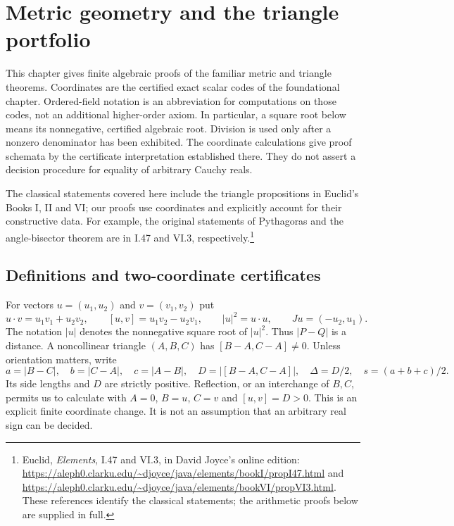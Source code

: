 \section{Metric geometry and the triangle portfolio}
\label{sec:triangles}

This chapter gives finite algebraic proofs of the familiar metric and triangle
theorems.  Coordinates are the certified exact scalar codes of the foundational
chapter.  Ordered-field notation is an abbreviation for computations on those
codes, not an additional higher-order axiom.  In particular, a square root below
means its nonnegative, certified algebraic root.  Division is used only after a
nonzero denominator has been exhibited.  The coordinate calculations give
\ipra{} proof schemata by the certificate interpretation established there.
They do not assert a decision procedure for equality of arbitrary Cauchy reals.

The classical statements covered here include the triangle propositions in
Euclid's Books I, II and VI; our proofs use coordinates and explicitly account
for their constructive data.  For example, the original statements of
Pythagoras and the angle-bisector theorem are in I.47 and VI.3,
respectively.\footnote{Euclid, \emph{Elements}, I.47 and VI.3, in David Joyce's
online edition:
\url{https://aleph0.clarku.edu/~djoyce/java/elements/bookI/propI47.html} and
\url{https://aleph0.clarku.edu/~djoyce/java/elements/bookVI/propVI3.html}.
These references identify the classical statements; the arithmetic proofs
below are supplied in full.}

\subsection{Definitions and two-coordinate certificates}

For vectors $u=(u_1,u_2)$ and $v=(v_1,v_2)$ put
\[
 u\mathbin{\cdot}v=u_1v_1+u_2v_2,\qquad
 [u,v]=u_1v_2-u_2v_1,\qquad
 |u|^2=u\mathbin{\cdot}u,\qquad
 Ju=(-u_2,u_1).
\]
The notation $|u|$ denotes the nonnegative square root of $|u|^2$.
Thus $|P-Q|$ is a distance.  A noncollinear triangle $(A,B,C)$ has
$[B-A,C-A]\ne0$.  Unless orientation matters, write
\[
 a=|B-C|,\quad b=|C-A|,\quad c=|A-B|,\quad
 D=|[B-A,C-A]|,\quad \Delta=D/2,\quad s=(a+b+c)/2.
\]
Its side lengths and $D$ are strictly positive.  Reflection, or an interchange
of $B,C$, permits us to calculate with $A=0$, $B=u$, $C=v$ and $[u,v]=D>0$.
This is an explicit finite coordinate change.  It is not an assumption that
an arbitrary real sign can be decided.

